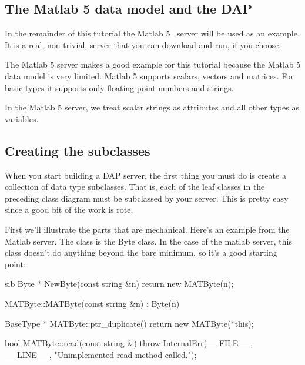 \documentclass{dods-paper}
\begin{document}
\subsection{The Matlab 5 data model and the DAP}

In the remainder of this tutorial the Matlab 5 \opendap\ server will be used
as an example. It is a real, non-trivial, server that you can download and
run, if you choose.

The Matlab 5 server makes a good example for this tutorial because the Matlab
5 data model is very limited. Matlab 5 supports scalars, vectors and
matrices. For basic types it supports only floating point numbers and
strings.

In the Matlab 5 server, we treat scalar strings as attributes and all other
types as variables.

\subsection{Creating the subclasses}

When you start building a DAP server, the first thing you must do is
create a collection of data type subclasses. That is, each of the leaf
classes in the preceding class diagram must be subclassed by your
server. This is pretty easy since a good bit of the work is rote.

First we'll illustrate the parts that are mechanical. Here's an
example from the Matlab server. The class is the Byte class. In the
case of the matlab server, this class doesn't do anything beyond the
bare minimum, so it's a good starting point:

\begin{vcode}{sib}
Byte *
NewByte(const string &n)
{
    return new MATByte(n);
}

MATByte::MATByte(const string &n) : Byte(n)
{
}

BaseType *
MATByte::ptr_duplicate()
{
    return new MATByte(*this);
}

bool
MATByte::read(const string &)
{
    throw InternalErr(__FILE__, __LINE__, "Unimplemented read method
    called.");
}
\end{vcode}
\end{document}

